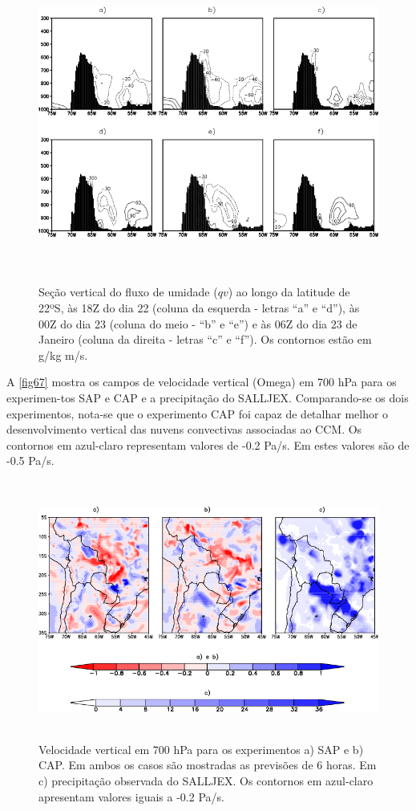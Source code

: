 \begin{figure}
\centering
\includegraphics[height=10.5cm]{./figs/sec_vert_flux_umi.png}
\caption{Seção vertical do fluxo de umidade ($qv$) ao longo da latitude de 22ºS, às 18Z do dia 22 (coluna da esquerda - letras ``a'' e ``d''), às 00Z do dia 23 (coluna do meio - ``b'' e ``e'') e às 06Z do dia 23 de Janeiro (coluna da direita - letras ``c'' e ``f''). Os contornos estão em g/kg m/s.}
\label{fig66}
\end{figure}

A \autoref{fig67} mostra os campos de velocidade vertical (Omega) em 700 hPa para os experimen-tos SAP e CAP e a precipitação do SALLJEX. Comparando-se os dois experimentos, nota-se que o experimento CAP foi capaz de detalhar melhor o desenvolvimento vertical das nuvens convectivas associadas ao CCM. Os contornos em azul-claro representam valores de -0.2 Pa/s. Em  estes valores são de -0.5 Pa/s.
 
\begin{figure}
\centering
\includegraphics[height=8.5cm]{./figs/vel_vert_omega_salljex.png}
\caption{Velocidade vertical em 700 hPa para os experimentos a) SAP e b) CAP. Em ambos os casos são mostradas as previsões de 6 horas. Em c) precipitação observada do SALLJEX. Os contornos em azul-claro apresentam valores iguais a -0.2 Pa/s.}
\label{fig67}
\end{figure}
